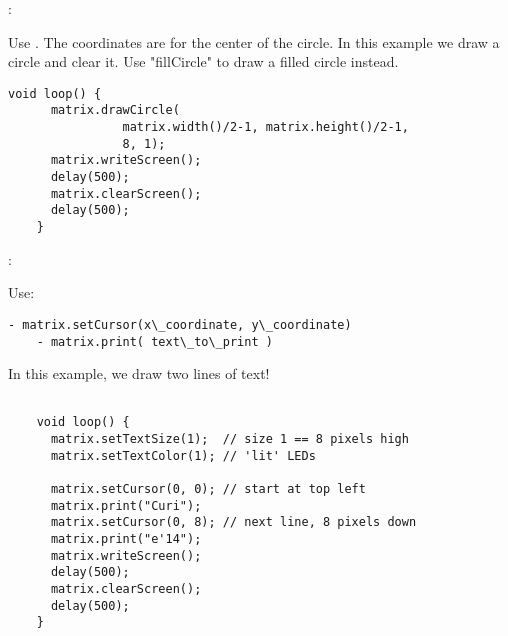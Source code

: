 \begin{minipage}[t]{0.49\tw}
  \vspace{0.0in}

  :
  \vspace{0.1in}

  Use . The coordinates are for the center of the circle. In
  this example we draw a circle and clear it. Use "fillCircle" to draw a
  filled circle instead.

  \begin{Verbatim}[gobble=3,fontsize=\small]
    void loop() {
      matrix.drawCircle(
                matrix.width()/2-1, matrix.height()/2-1,
                8, 1);
      matrix.writeScreen();
      delay(500);
      matrix.clearScreen();
      delay(500);
    }
  \end{Verbatim}

  :
  \vspace{0.1in}

  Use:
  \begin{Verbatim}[gobble=3,fontsize=\small]
    - matrix.setCursor(x\_coordinate, y\_coordinate)
    - matrix.print( text\_to\_print )
  \end{Verbatim}

  In this example, we draw two lines of text!

  \begin{Verbatim}[gobble=3,fontsize=\small]

    void loop() {
      matrix.setTextSize(1);  // size 1 == 8 pixels high
      matrix.setTextColor(1); // 'lit' LEDs

      matrix.setCursor(0, 0); // start at top left
      matrix.print("Curi");
      matrix.setCursor(0, 8); // next line, 8 pixels down
      matrix.print("e'14");
      matrix.writeScreen();
      delay(500);
      matrix.clearScreen();
      delay(500);
    }
  \end{Verbatim}
\end{minipage}

